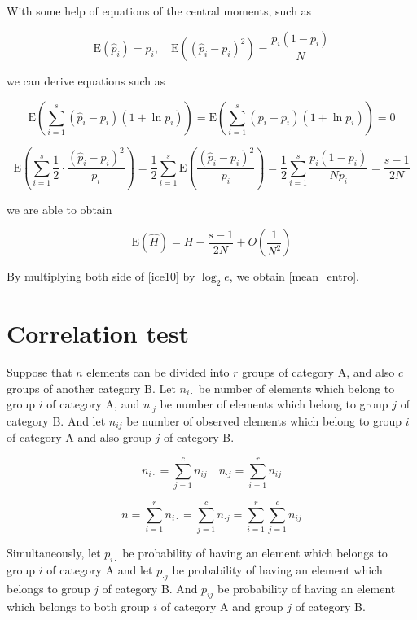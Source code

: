 \noindent
With some help of equations of the central moments, such as

\[
\mbox{E}(\hat p_{i}) = p_{i}, \quad \mbox{E}((\hat p_{i} - p_{i})^{2}) = \frac{p_{i}(1-p_{i})}{N}
\]

\noindent
we can derive equations such as

\[
\mbox{E}\left(\sum_{i=1}^{s}(\hat p_{i} - p_{i})(1 + \ln p_{i}) \right)
= \mbox{E}\left(\sum_{i=1}^{s}(p_{i} - p_{i})(1 + \ln p_{i}) \right) = 0
\]

\[
 \mbox{E}\left(\sum_{i=1}^{s}\frac{1}{2}\cdot \frac{(\hat p_{i} -
 p_{i})^2}{p_{i}}\right)
= \frac{1}{2}\sum_{i=1}^{s}\mbox{E}
  \left(\frac{(\hat p_{i} - p_{i})^2}{p_{i}}\right)
= \frac{1}{2}\sum_{i=1}^{s}\frac{p_{i}(1-p_{i})}{Np_{i}}
= \frac{s-1}{2N}
\]


\noindent
we are able to obtain

\begin{equation}
\mbox{E}(\hat H) = H - \frac{s-1}{2N} + O\left(\frac{1}{N^{2}}\right)
\label{ice10}
\end{equation}

\noindent
By multiplying both side of \ref{ice10} by \(\log_{2}e\), we obtain \ref{mean_entro}.

\section{Correlation test}
\label{cor_test}

Suppose that \(n\) elements can be divided into \(r\) groups of
category A, and also \(c\) groups of another category B. Let
\(n_{i\cdot}\) be number of elements which belong to group \(i\) of
category A, and \(n_{\cdot j}\) be number of elements which belong to
group \(j\) of category B. And let \(n_{ij}\) be number of observed
elements which belong to group \(i\) of category A and also group
\(j\) of category B.

\[
n_{i\cdot} = \sum_{j=1}^{c}n_{ij}\quad
n_{\cdot j} = \sum_{i=1}^{r}n_{ij}
\]

\begin{equation}
n = \sum_{i=1}^{r}n_{i\cdot} = \sum_{j=1}^{c}n_{\cdot j} 
= \sum_{i=1}^{r}\sum_{j=1}^{c}n_{ij}
\end{equation}

Simultaneously, let \(p_{i\cdot}\) be probability of having an element
which belongs to group \(i\) of category A and let \(p_{\cdot j}\) be
probability of having an element which belongs to group \(j\) of
category B.  And \(p_{ij}\) be probability of having an element which
belongs to both group \(i\) of category A and group \(j\) of category
B.

